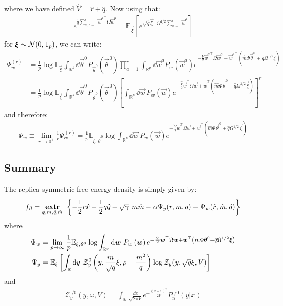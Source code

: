 \documentclass[11pt]{article}
\numberwithin{equation}{section}
\begin{document}
\noindent where we have defined $\hat{V} = \hat{r}+\hat{q}$. Now using that:
\begin{align}
	e^{\hat{q}\sum\limits_{a,b=1}^{r}{\vec{w}^{a}}^{\top}\Omega\vec{w}^{b}} = \mathbb{E}_{\vec{\xi}}\left[e^{\sqrt{\hat{q}}\vec{\xi}^{\top}\Omega^{1/2}\sum\limits_{a=1}^{r}\vec{w}^{a}}\right]
\end{align}
\noindent for $\bm{\xi}\sim\mathcal{N}(0,\text{1}_{p})$, we can write:
\begin{align}
\Psi_{w}^{(r)} &= \frac{1}{p}\log\mathbb{E}_{\vec{\xi}}\int_{\mathbb{R}^{k}}\dd\vec{\theta}^{0}P_{\vec{\theta}^{0}}\left(\vec{\theta}^{0}\right)\prod\limits_{a=1}^{r}\int_{\mathbb{R}^{p}}\dd\vec{w}^{a}P_{w}\left(\vec{w}^{a}\right) e^{-\frac{\hat{V}}{2}{\vec{w}^{a}}^{\top}\Omega\vec{w}^{a}+{\vec{w}^{a}}^{\top}\left(\hat{m}\Phi\vec{\theta}^{0}+\hat{q}\Omega^{1/2}\xi\right)}\\
&= \frac{1}{p}\log\mathbb{E}_{\vec{\xi}}\int_{\mathbb{R}^{k}}\dd\vec{\theta}^{0}P_{\vec{\theta}^{0}}\left(\vec{\theta}^{0}\right)\left[\int_{\mathbb{R}^{p}}\dd\vec{w}~P_{w}\left(\vec{w}\right) e^{-\frac{\hat{V}}{2}\vec{w}^{\top}\Omega\vec{w}+\vec{w}^{\top}\left(\hat{m}\Phi\vec{\theta}^{0}+\hat{q}\Omega^{1/2}\vec{\xi}\right)}\right]^{r}
\end{align}
\noindent and therefore:
\begin{align}
\Psi_{w}\equiv \lim\limits_{r\to 0^{+}}\frac{1}{r}\Psi_{w}^{(r)} = \frac{1}{p}\mathbb{E}_{\xi,\vec{\theta}^{0}}\log\int_{\mathbb{R}^{p}}\dd\vec{w}~P_{w}\left(\vec{w}\right) e^{-\frac{\hat{V}}{2}\vec{w}^{\top}\Omega\vec{w}+\vec{w}^{\top}\left(\hat{m}\Phi\vec{\theta}^{0}+\hat{q}\Omega^{1/2}\vec{\xi}\right)}
\end{align}

\subsection*{Summary}
The replica symmetric free energy density is simply given by:
\begin{align}
f_{\beta} = \underset{q,m,\hat{q},\hat{m}}{\textrm{\textbf{extr}}}~\left\{-\frac{1}{2}r\hat{r}-\frac{1}{2}q\hat{q}+\sqrt{\gamma}~m\hat{m}-\alpha \Psi_{y}(r, m,q) -	 \Psi_{w}(\hat{r}, 	\hat{m},\hat{q})\right\}
\label{eq:freeen:final}
\end{align}
\noindent where
\begin{align}
\Psi_{w} &= \lim\limits_{p\to\infty} \frac{1}{p}\mathbb{E}_{\xi,\bm{\theta}^{0}}\log\int_{\mathbb{R}^{p}}\text{d}\bm{w}~P_{w}\left(\bm{w}\right) e^{-\frac{\hat{V}}{2}\bm{w}^{\top}\Omega\bm{w}+\bm{w}^{\top}\left(\hat{m}\Phi\bm{\theta}^{0}+\hat{q}\Omega^{1/2}\bm{\xi}\right)}\notag\\
\Psi_{y} &= \mathbb{E}_{\xi}\left[\int_{\mathbb{R}}\text{d} y~\mathcal{Z}_{y}^{0}\left(y,\frac{m}{\sqrt{q}}\xi, \rho-\frac{m^2}{q}\right)\log\mathcal{Z}_{y}(y,\sqrt{q}\xi,V)\right]
\end{align}
\noindent and 
\begin{align}
\mathcal{Z}_{y}^{\cdot/0}(y,\omega,V) = \int_{\mathbb{R}}\frac{\dd x}{\sqrt{2\pi V}}e^{-\frac{(x-\omega)^2}{2V}}P^{\cdot/0}_{y}(y|x)	
\end{align}
\end{document}
